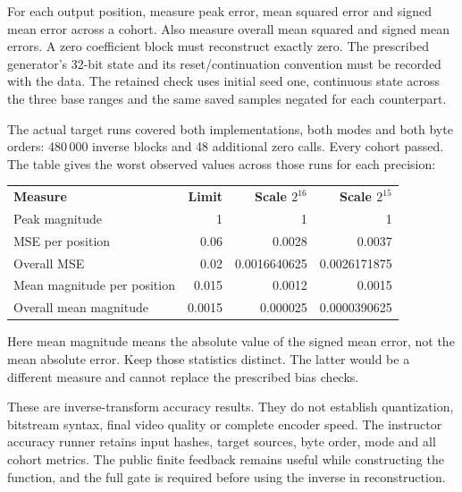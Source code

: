 For each output position, measure peak error, mean squared error and signed mean
error across a cohort. Also measure overall mean squared and signed mean errors.
A zero coefficient block must reconstruct exactly zero. The prescribed generator's
32-bit state and its reset/continuation convention must be recorded with the data.
The retained check uses initial seed one, continuous state across the three base
ranges and the same saved samples negated for each counterpart.

The actual target runs covered both implementations, both modes and both byte
orders: 480\,000 inverse blocks and 48 additional zero calls. Every cohort passed.
The table gives the worst observed values across those runs for each precision:
\begin{center}
  \begin{tabular}{lrrr}
    \textbf{Measure}            & \textbf{Limit} & \textbf{Scale $2^{16}$} & \textbf{Scale $2^{15}$} \\
    Peak magnitude              & 1              & 1                       & 1                       \\
    MSE per position            & 0.06           & 0.0028                  & 0.0037                  \\
    Overall MSE                 & 0.02           & 0.0016640625            & 0.0026171875            \\
    Mean magnitude per position & 0.015          & 0.0012                  & 0.0015                  \\
    Overall mean magnitude      & 0.0015         & 0.000025                & 0.0000390625
  \end{tabular}
\end{center}
Here mean magnitude means the absolute value of the signed mean error, not the
mean absolute error. Keep those statistics distinct. The latter would be a
different measure and cannot replace the prescribed bias checks.

These are inverse-transform accuracy results. They do not establish quantization,
bitstream syntax, final video quality or complete encoder speed. The instructor
accuracy runner retains input hashes, target sources, byte order, mode and all
cohort metrics. The public finite feedback remains useful while constructing the
function, and the full gate is required before using the inverse in reconstruction.
